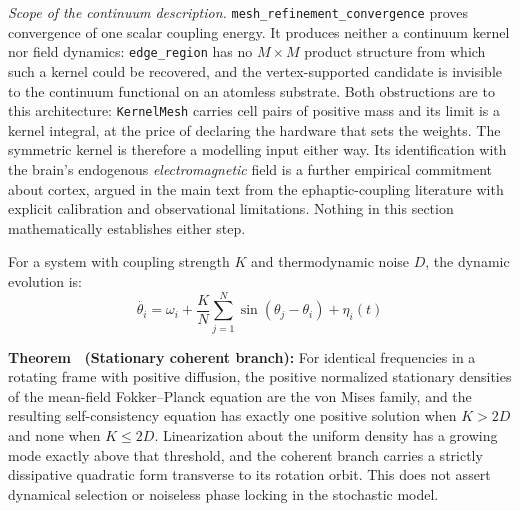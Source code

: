 \documentclass{article}
\begin{document}
\textit{Scope of the continuum description.} \nolinkurl{mesh_refinement_convergence} proves convergence of one scalar coupling energy. It produces neither a continuum kernel nor field dynamics: \nolinkurl{edge_region} has no $M\times M$ product structure from which such a kernel could be recovered, and the vertex-supported candidate is invisible to the continuum functional on an atomless substrate. Both obstructions are to this architecture: \texttt{KernelMesh} carries cell pairs of positive mass and its limit is a kernel integral, at the price of declaring the hardware that sets the weights. The symmetric kernel is therefore a modelling input either way. Its identification with the brain's endogenous \emph{electromagnetic} field is a further empirical commitment about cortex, argued in the main text from the ephaptic-coupling literature with explicit calibration and observational limitations. Nothing in this section mathematically establishes either step.

For a system with coupling strength $K$ and thermodynamic noise $D$, the dynamic evolution is:
\begin{equation}
\dot{\theta_i} = \omega_i + \frac{K}{N} \sum_{j=1}^N \sin(\theta_j - \theta_i) + \eta_i(t)
\end{equation}

\label{thm:supp-stationary}
\textbf{Theorem \thesuppresult\ (Stationary coherent branch):} For identical frequencies in a rotating frame with positive diffusion, the positive normalized stationary densities of the mean-field Fokker--Planck equation are the von Mises family, and the resulting self-consistency equation has exactly one positive solution when $K>2D$ and none when $K\leq2D$. Linearization about the uniform density has a growing mode exactly above that threshold, and the coherent branch carries a strictly dissipative quadratic form transverse to its rotation orbit. This does not assert dynamical selection or noiseless phase locking in the stochastic model.
\end{document}
